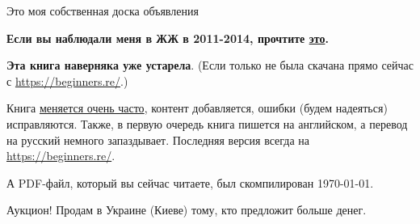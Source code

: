 
\begin{center}
\LARGE{} Это моя собственная доска объявления \normalsize{}
\end{center}

\textbf{Если вы наблюдали меня в ЖЖ в 2011-2014, прочтите \href{http://link.yurichev.com/46001}{это}.}

\myhrule{}

\textbf{Эта книга наверняка уже устарела}.
(Если только не была скачана прямо сейчас с \url{https://beginners.re/}.)

Книга \href{\RepoURL/ChangeLog}{меняется очень часто},
контент добавляется, ошибки (будем надеяться) исправляются.
Также, в первую очередь книга пишется на английском, а перевод на русский немного запаздывает.
Последняя версия всегда на \url{https://beginners.re/}.

А PDF-файл, который вы сейчас читаете, был скомпилирован \today{}.

\myhrule{}

Аукцион!
Продам в Украине (Киеве) тому, кто предложит больше денег.

